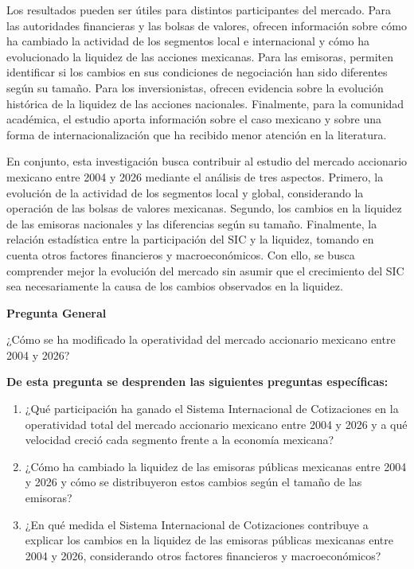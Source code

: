 Los resultados pueden ser útiles para distintos participantes del mercado. Para las autoridades financieras y las bolsas de valores, ofrecen información sobre cómo ha cambiado la actividad de los segmentos local e internacional y cómo ha evolucionado la liquidez de las acciones mexicanas. Para las emisoras, permiten identificar si los cambios en sus condiciones de negociación han sido diferentes según su tamaño. Para los inversionistas, ofrecen evidencia sobre la evolución histórica de la liquidez de las acciones nacionales. Finalmente, para la comunidad académica, el estudio aporta información sobre el caso mexicano y sobre una forma de internacionalización que ha recibido menor atención en la literatura.

En conjunto, esta investigación busca contribuir al estudio del mercado accionario mexicano entre 2004 y 2026 mediante el análisis de tres aspectos. Primero, la evolución de la actividad de los segmentos local y global, considerando la operación de las bolsas de valores mexicanas. Segundo, los cambios en la liquidez de las emisoras nacionales y las diferencias según su tamaño. Finalmente, la relación estadística entre la participación del SIC y la liquidez, tomando en cuenta otros factores financieros y macroeconómicos. Con ello, se busca comprender mejor la evolución del mercado sin asumir que el crecimiento del SIC sea necesariamente la causa de los cambios observados en la liquidez.


\textbf{Pregunta General}

¿Cómo se ha modificado la operatividad del mercado accionario mexicano entre 2004 y 2026?

\textbf{De esta pregunta se desprenden las siguientes preguntas específicas:}

\begin{enumerate}
\def\labelenumi{\arabic{enumi}.}
\item
  ¿Qué participación ha ganado el Sistema Internacional de Cotizaciones en la operatividad total del mercado accionario mexicano entre 2004 y 2026 y a qué velocidad creció cada segmento frente a la economía mexicana?
\item
  ¿Cómo ha cambiado la liquidez de las emisoras públicas mexicanas entre 2004 y 2026 y cómo se distribuyeron estos cambios según el tamaño de las emisoras?
\item
  ¿En qué medida el Sistema Internacional de Cotizaciones contribuye a explicar los cambios en la liquidez de las emisoras públicas mexicanas entre 2004 y 2026, considerando otros factores financieros y macroeconómicos?
\end{enumerate}

